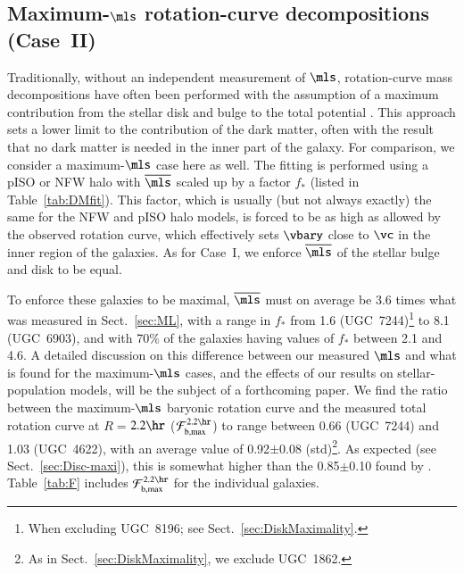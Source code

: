 \documentclass[traditabstract]{aa} %
\begin{document}
\subsection{Maximum-$\mls$ rotation-curve decompositions (Case~II)}
\label{sec:maxdisk}
Traditionally, without an independent measurement of $\mls$, rotation-curve mass 
decompositions have often been performed with the assumption of a maximum contribution 
from the stellar disk and bulge to the total potential
\citep[e.g.,][]{albada1985,kent1986,BroeilsCourteau1997}. This approach sets a lower
limit to the contribution of the dark matter, often with the result that no dark matter is 
needed in the inner part of the galaxy. For comparison, we consider a maximum-$\mls$ case
here as well. The fitting is performed using a pISO or NFW halo with ${\overline{\mls}}$
scaled up by a factor $f_\ast$ (listed in Table~\ref{tab:DMfit}). This
factor, which is usually (but not always exactly) the same for the NFW and pISO halo
models, is forced to be as high as allowed by the observed rotation curve, which
effectively sets $\vbary$ close to $\vc$ in the inner region of the galaxies. As for
Case~I, we enforce ${\overline{\mls}}$ of the stellar bulge and disk to be equal.

To enforce these galaxies to be maximal, $\overline{\mls}$ must on average be 3.6
times what was measured in Sect.~\ref{sec:ML}, with a range in $f_\ast$ from 1.6 
(UGC~7244)\footnote{When excluding UGC~8196; see Sect.~\ref{sec:DiskMaximality}.} to 8.1
(UGC~6903), and with 70\% of the galaxies having values of $f_\ast$ between 2.1 and 4.6.
A detailed discussion on this difference between our measured $\mls$ and what is found for
the maximum-$\mls$ cases, and the effects of our results on stellar-population
models, will be the subject of a forthcoming paper.
We find the ratio between the maximum-$\mls$ baryonic rotation curve and the
measured total rotation curve at $R$$=$$2.2\hr$ ($\mathcal{F}_{\rm b,max}^{2.2\hr}$) to
range between 0.66 (UGC~7244) and 1.03 (UGC~4622), with an average value of 0.92$\pm$0.08
(std)\footnote{As in Sect.~\ref{sec:DiskMaximality}, we exclude UGC~1862.}.
As expected (see Sect.~\ref{sec:Disc-maxi}), this is somewhat higher than the
0.85$\pm$0.10 found by \cite{sackett1997}. Table~\ref{tab:F} includes
$\mathcal{F}_{\rm b,max}^{2.2\hr}$ for the individual galaxies.
\end{document}
